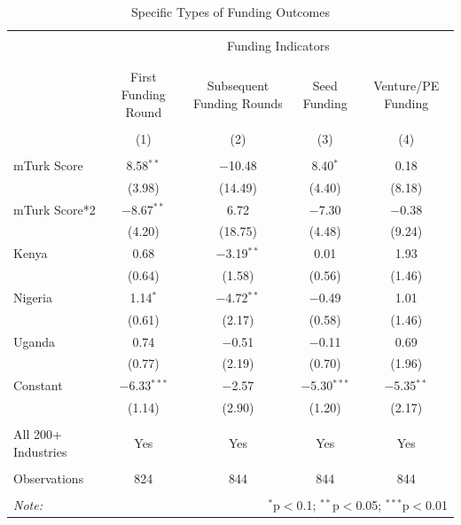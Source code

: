 \documentclass[12pt]{article}
\begin{document}
\begin{table}[!htbp] \centering 
  \caption{Specific Types of Funding Outcomes} 
  \label{} 
\footnotesize 
\begin{tabular}{@{\extracolsep{5pt}}lcccc} 
\\[-1.8ex]\hline 
\hline \\[-1.8ex] 
 & \multicolumn{4}{c}{Funding Indicators} \\ 
\cline{2-5} 
\\[-1.8ex] &  &  &  &  \\ 
 & First Funding Round & Subsequent Funding Rounds & Seed Funding & Venture/PE Funding \\ 
\\[-1.8ex] & (1) & (2) & (3) & (4)\\ 
\hline \\[-1.8ex] 
 mTurk Score & 8.58$^{**}$ & $-$10.48 & 8.40$^{*}$ & 0.18 \\ 
  & (3.98) & (14.49) & (4.40) & (8.18) \\ 
  mTurk Score*2 & $-$8.67$^{**}$ & 6.72 & $-$7.30 & $-$0.38 \\ 
  & (4.20) & (18.75) & (4.48) & (9.24) \\ 
  Kenya & 0.68 & $-$3.19$^{**}$ & 0.01 & 1.93 \\ 
  & (0.64) & (1.58) & (0.56) & (1.46) \\ 
  Nigeria & 1.14$^{*}$ & $-$4.72$^{**}$ & $-$0.49 & 1.01 \\ 
  & (0.61) & (2.17) & (0.58) & (1.46) \\ 
  Uganda & 0.74 & $-$0.51 & $-$0.11 & 0.69 \\ 
  & (0.77) & (2.19) & (0.70) & (1.96) \\ 
  Constant & $-$6.33$^{***}$ & $-$2.57 & $-$5.30$^{***}$ & $-$5.35$^{**}$ \\ 
  & (1.14) & (2.90) & (1.20) & (2.17) \\ 
 \hline \\[-1.8ex] 
 All 200+ Industries & Yes & Yes & Yes & Yes \\ 
  \hline \\[-1.8ex] 
Observations & 824 & 844 & 844 & 844 \\ 
\hline 
\hline \\[-1.8ex] 
\textit{Note:}  & \multicolumn{4}{r}{$^{*}$p$<$0.1; $^{**}$p$<$0.05; $^{***}$p$<$0.01} \\ 
\end{tabular} 
\end{table} 
\end{document}

